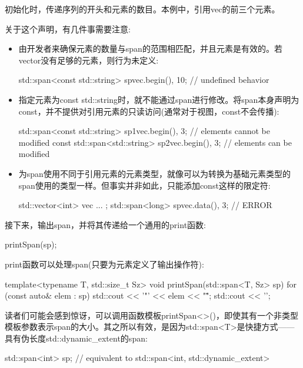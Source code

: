初始化时，传递序列的开头和元素的数目。本例中，引用vec的前三个元素。

关于这个声明，有几件事需要注意:

\begin{itemize}
\item
由开发者来确保元素的数量与span的范围相匹配，并且元素是有效的。若vector没有足够的元素，则行为未定义:

\begin{cpp}
std::span<const std::string> sp{vec.begin(), 10}; // undefined behavior
\end{cpp}

\item
指定元素为const std::string时，就不能通过span进行修改。将span本身声明为const，并不提供对引用元素的只读访问(通常对于视图，const不会传播):

\begin{cpp}
std::span<const std::string> sp1{vec.begin(), 3}; // elements cannot be modified
const std::span<std::string> sp2{vec.begin(), 3}; // elements can be modified
\end{cpp}

\item
为span使用不同于引用元素的元素类型，就像可以为转换为基础元素类型的span使用的类型一样。但事实并非如此，只能添加const这样的限定符:

\begin{cpp}
std::vector<int> vec{ ... };
std::span<long> sp{vec.data(), 3}; // ERROR
\end{cpp}
\end{itemize}


接下来，输出span，并将其传递给一个通用的print函数:

\begin{cpp}
printSpan(sp);
\end{cpp}

print函数可以处理span(只要为元素定义了输出操作符):

\begin{cpp}
template<typename T, std::size_t Sz>
void printSpan(std::span<T, Sz> sp)
{
	for (const auto& elem : sp) {
		std::cout << '"' << elem << "\" ";
	}
	std::cout << '\n';
}
\end{cpp}

读者们可能会感到惊讶，可以调用函数模板printSpan<>()，即使其有一个非类型模板参数表示span的大小。其之所以有效，是因为std::span<T>是快捷方式——具有伪长度std::dynamic\_extent的span:

\begin{cpp}
std::span<int> sp; // equivalent to std::span<int, std::dynamic_extent>
\end{cpp}

